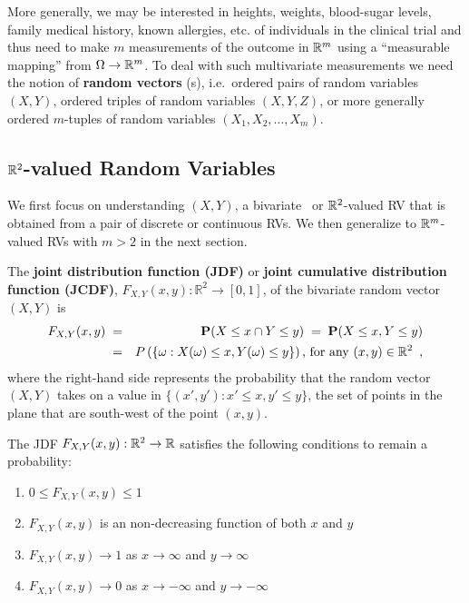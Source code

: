 More generally, we may be interested in heights, weights, blood-sugar levels, family medical history, known allergies, etc. of individuals in the clinical trial and thus need to make $m$ measurements of the outcome in $\mathbb{R}^m$ using a ``measurable mapping'' from $\Omega \to \mathbb{R}^m$.  
To deal with such multivariate measurements we need the notion of {\bf random vectors} ({\rv}s), i.e.~ordered pairs of random variables $(X,Y)$, ordered triples of random variables $(X,Y,Z)$, or more generally ordered $m$-tuples of random variables $(X_1,X_2,\ldots,X_m)$.  

\subsection{$\mathbb{R}^2$-valued Random Variables}

We first focus on understanding $(X,Y)$, a bivariate \rv~or $\mathbb{R}^2$-valued RV that is obtained from a pair of discrete or continuous RVs.  
We then generalize to $\mathbb{R}^m$-valued RVs with $m>2$ in the next section.

\begin{definition}[JDF]\label{Df:JDF}
The {\bf joint distribution function (JDF)} or {\bf joint cumulative distribution function (JCDF)}, $F_{X,Y}(x,y):\mathbb{R}^2\to [0,1]$, of the bivariate random vector $(X,Y)$ is
\begin{eqnarray}\label{E:j2DF}
F_{X,Y}(x,y)\; 
&=& \mathbf{P}(X\leq x \cap Y \leq y) \;= \;\mathbf{P}(X\leq x , Y \leq y)\notag\\
&=& P\left( \{ \omega: X(\omega) \le x, Y(\omega) \le y \} \right) \mbox{, for any } (x,y) \in \mathbb{R}^2 \enspace ,
\end{eqnarray}
where the right-hand side represents the probability that the random vector $(X,Y)$ takes on a value in 
$\{(x',y'): x' \leq x, y' \leq y\}$, the set of points in the plane that are south-west of the point $(x,y)$.
\end{definition}

The JDF $F_{X,Y}(x,y):\mathbb{R}^2\to\mathbb{R}$ satisfies the following conditions to remain a probability: 
\begin{enumerate}
\item $0 \leq F_{X,Y}(x,y) \leq 1$
\item $F_{X,Y}(x,y)$ is an non-decreasing function of both $x$ and $y$
\item $F_{X,Y}(x,y) \to 1$ as $x\to \infty$ and $y\to \infty$
\item $F_{X,Y}(x,y) \to 0$ as $x\to -\infty$ and $y\to -\infty$
\end{enumerate}


